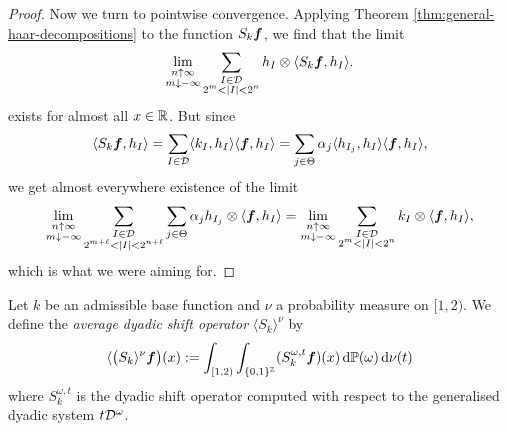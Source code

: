 \begin{proof}
   Now we turn to pointwise convergence.
   Applying Theorem \ref{thm:general-haar-decompositions} to the function $S_{k}\bm{f}$, we find that the limit
   \begin{equation*}
     \lim_{\substack{n \uparrow \infty \\ m \downarrow -\infty}} \sum_{\substack{I \in \mathcal{D} \\ 2^{m} < |I| < 2^{n}}} h_{I} \otimes \langle S_{k} \bm{f}, h_{I} \rangle.
   \end{equation*}
   exists for almost all $x \in \mathbb{R}$.
   But since
   \begin{equation*}
     \langle S_{k} \bm{f}, h_{I} \rangle = \sum_{I \in \mathcal{D}} \langle  k_{I} , h_{I} \rangle \langle \bm{f}, h_{I} \rangle  = \sum_{j \in \Theta} \alpha_{j} \langle h_{I_{j}}, h_{I} \rangle \langle \bm{f}, h_{I} \rangle,
   \end{equation*}
   we get almost everywhere existence of the limit
   \begin{equation*}
     \lim_{\substack{n \uparrow \infty \\ m \downarrow -\infty}}  \sum_{\substack{I \in \mathcal{D} \\ 2^{m + \ell} < |I| < 2^{n + \ell}}} \sum_{j \in \Theta} \alpha_{j} h_{I_{j}} \otimes \langle \bm{f}, h_{I} \rangle
     = \lim_{\substack{n \uparrow \infty \\ m \downarrow -\infty}}  \sum_{\substack{I \in \mathcal{D} \\ 2^{m} < |I| < 2^{n}}} k_{I} \otimes \langle \bm{f}, h_{I} \rangle,
   \end{equation*}
   which is what we were aiming for.
\end{proof}

\begin{defn}
  Let $k$ be an admissible base function and $\nu$ a probability measure on $[1,2)$.
  We define the \emph{average dyadic shift operator} $\langle S_k \rangle^{\nu}$ by
  \begin{equation*}
    \langle \big(S_{k} \rangle^{\nu}\bm{f}\big)(x) := \int_{[1,2)} \int_{\{0,1\}^{\mathbb{Z}}} (S_{k}^{\omega, t}\bm{f})(x) \, \mathrm{d} \mathbb{P}(\omega) \, \mathrm{d} \nu(t)
  \end{equation*}
  where $S_{k}^{\omega,t}$ is the dyadic shift operator computed with respect to the generalised dyadic system $t\mathcal{D}^{\omega}$.
\end{defn}


